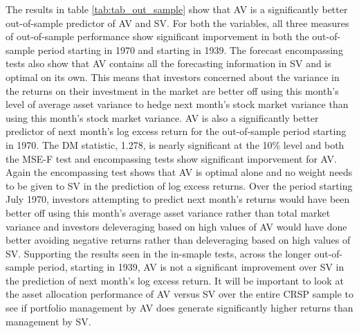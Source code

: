 The results in table \ref{tab:tab_out_sample} show that AV is a significantly better out-of-sample predictor of AV and SV. For both the variables, all three measures of out-of-sample performance show significant imporvement in both the out-of-sample period starting in 1970 and starting in 1939. The forecast encompassing tests also show that AV contains all the forecasting information in SV and is optimal on its own. This means that investors concerned about the variance in the returns on their investment in the market are better off using this month's level of average asset variance to hedge next month's stock market variance than using this month's stock market variance. AV is also a significantly better predictor of next month's log excess return for the out-of-sample period starting in 1970. The DM statistic, 1.278, is nearly significant at the 10\% level and both the MSE-F test and encompassing tests show significant imporvement for AV. Again the encompassing test shows that AV is optimal alone and no weight needs to be given to SV in the prediction of log excess returns. Over the period starting July 1970, investors attempting to predict next month's returns would have been better off using this month's average asset variance rather than total market variance and investors deleveraging based on high values of AV would have done better avoiding negative returns rather than deleveraging based on high values of SV. Supporting the results seen in the in-smaple tests, across the longer out-of-sample period, starting in 1939, AV is not a significant improvement over SV in the prediction of next month's log excess return. It will be important to look at the asset allocation performance of AV versus SV over the entire CRSP sample to see if portfolio management by AV does generate significantly higher returns than management by SV.


